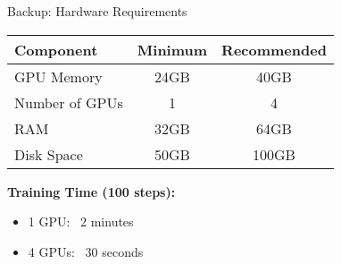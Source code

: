 \documentclass[aspectratio=169]{beamer}
\begin{document}
\begin{frame}{Backup: Hardware Requirements}
\begin{table}
\centering
\begin{tabular}{lcc}
\toprule
\textbf{Component} & \textbf{Minimum} & \textbf{Recommended} \\
\midrule
GPU Memory & 24GB & 40GB \\
Number of GPUs & 1 & 4 \\
RAM & 32GB & 64GB \\
Disk Space & 50GB & 100GB \\
\bottomrule
\end{tabular}
\end{table}

\vspace{0.3cm}
\textbf{Training Time (100 steps):}
\begin{itemize}
    \item 1 GPU: ~2 minutes
    \item 4 GPUs: ~30 seconds
\end{itemize}
\end{frame}
\end{document}
